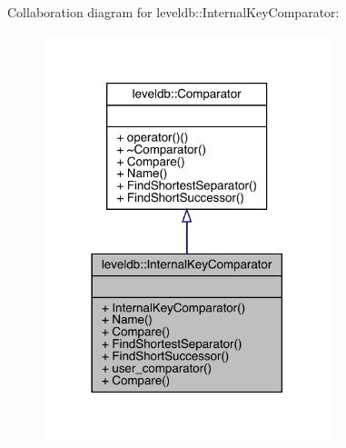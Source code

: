 Collaboration diagram for leveldb\+::Internal\+Key\+Comparator\+:
\nopagebreak
\begin{figure}[H]
\begin{center}
\leavevmode
\includegraphics[width=237pt]{classleveldb_1_1_internal_key_comparator__coll__graph}
\end{center}
\end{figure}
